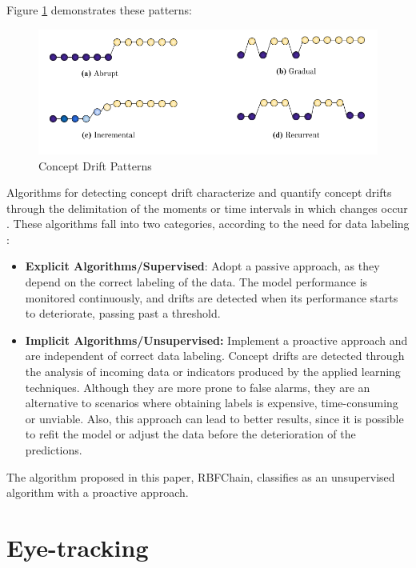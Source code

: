 \documentclass[preprint,12pt]{elsarticle}
\begin{document}
Figure \ref{fig:concept_drift_patterns} demonstrates these patterns:

\begin{figure}[h!]
\begin{center}
    \includegraphics[scale=0.65]{img/concept_drift_patterns.png}
    \caption{Concept Drift Patterns}
    \label{fig:concept_drift_patterns}
\end{center}
\end{figure}

Algorithms for detecting concept drift characterize and quantify concept drifts through the delimitation of the moments or time intervals in which changes occur \cite{Basseville:1993:DAC:151741}.
%
These algorithms fall into two categories, according to the need for data labeling \cite{Zliobaite:2010}:

\begin{itemize}
    \item \textbf{Explicit Algorithms/Supervised}: Adopt a passive approach, as they depend on the correct labeling of the data.
    The model performance is monitored continuously, and drifts are detected when its performance starts to deteriorate, passing past a threshold.
    \item \textbf{Implicit Algorithms/Unsupervised:} Implement a proactive approach and are independent of correct data labeling.
    Concept drifts are detected through the analysis of incoming data or indicators produced by the applied learning techniques.
    Although they are more prone to false alarms, they are an alternative to scenarios where obtaining labels is expensive, time-consuming or unviable.
    Also, this approach can lead to better results, since it is possible to refit the model or adjust the data before the deterioration of the predictions.
\end{itemize}

The algorithm proposed in this paper, RBFChain, classifies as an unsupervised algorithm with a proactive approach.

\section{Eye-tracking}
\label{sec:eye_tracking}
\end{document}

